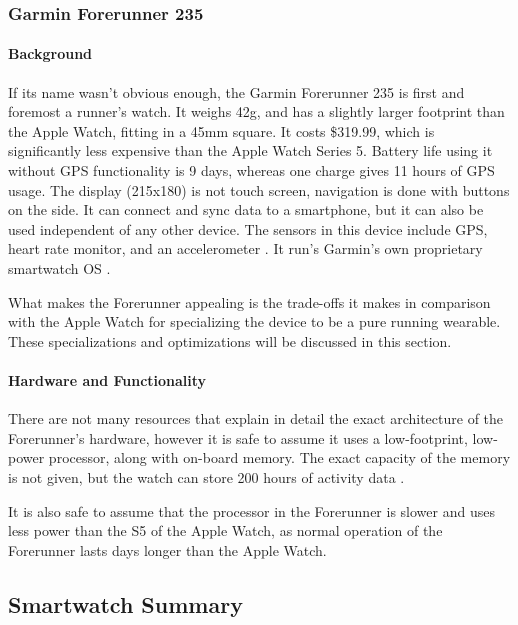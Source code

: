 \subsubsection{Garmin Forerunner 235}
\paragraph{Background}
If its name wasn't obvious enough, the Garmin Forerunner 235 is first and foremost a runner's
watch. It weighs 42g, and has a slightly larger footprint than the Apple Watch, fitting in a 45mm square.
It costs \$319.99, which is significantly less expensive than the Apple Watch Series 5. Battery life using
it without GPS functionality is 9 days, whereas one charge gives 11 hours of GPS usage. The display (215x180)
is not touch screen, navigation is done with buttons on the side. It can connect and 
sync data to a smartphone, but it can also be used independent of any other device. The sensors 
in this device include GPS, heart rate monitor, and an accelerometer \cite{garmin_price}. 
It run's Garmin's own proprietary smartwatch OS \cite{garmin_specs}.

What makes the Forerunner appealing is the trade-offs it makes in comparison with the Apple Watch
for specializing the device to be a pure running wearable. These specializations and optimizations will
be discussed in this section.

\paragraph{Hardware and Functionality}
There are not many resources that explain in detail the exact architecture of the Forerunner's hardware,
however it is safe to assume it uses a low-footprint, low-power processor, along with on-board memory.
The exact capacity of the memory is not given, but the watch can store 200 hours of activity data \cite{garmin_price}.

It is also safe to assume that the processor in the Forerunner is slower and uses less power than the S5
of the Apple Watch, as normal operation of the Forerunner lasts days longer than the Apple Watch.


\subsection{Smartwatch Summary}
